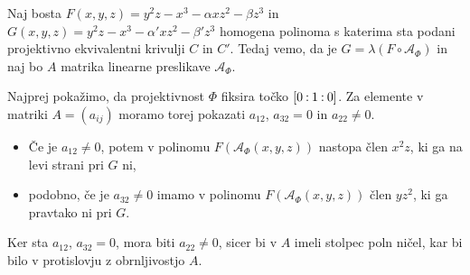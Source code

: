\documentclass[mat1]{fmfdelo}
\numberwithin{equation}{section}
\newcommand{\linphi}{\mathcal{A}_\Phi}
\newcommand{\oio}{\pcoor{0: 1 : 0}}
\newcommand{\pcoor}[1]{%
\begingroup\lccode`~=`: \lowercase{\endgroup
\edef~}{\mathbin{\mathchar\the\mathcode`:}\nobreak}%
\left[%
\begingroup
\mathcode`:=\string"8000
#1%
\endgroup
\right]%
}
\theoremstyle{definition}
\begin{document}
\begin{dokaz}
    Naj bosta $F(x,y,z) = y^2z - x^3 - \alpha xz^2 - \beta z^3$ in $G(x, y, z) = y^2z - x^3 - \alpha' xz^2 - \beta' z^3$ homogena polinoma s katerima sta podani projektivno ekvivalentni krivulji $C$ in $C'$. Tedaj vemo, da je $G = \lambda(F \circ \linphi)$ in naj bo $A$ matrika linearne preslikave $\linphi$.
    
    Najprej pokažimo, da projektivnost $\Phi$ fiksira točko $\oio$. Za elemente v matriki $A = (a_{ij})$ moramo torej pokazati $a_{12}$, $a_{32} = 0$ in $a_{22} \neq 0$. 
    \begin{itemize}
        \item Če je $a_{12} \neq 0$, potem v polinomu $F(\linphi(x,y,z))$ nastopa člen $x^2z$, ki ga na levi strani pri $G$ ni, 
        \item podobno, če je $a_{32} \neq 0$ imamo v polinomu $F(\linphi(x,y,z))$ člen $yz^2$, ki ga pravtako ni pri $G$. 
    \end{itemize}
    Ker sta $a_{12}$, $a_{32} = 0$, mora biti $a_{22} \neq 0$, sicer bi v $A$ imeli stolpec poln ničel, kar bi bilo v protislovju z obrnljivostjo $A$. 
    

\end{dokaz}
\end{document}
